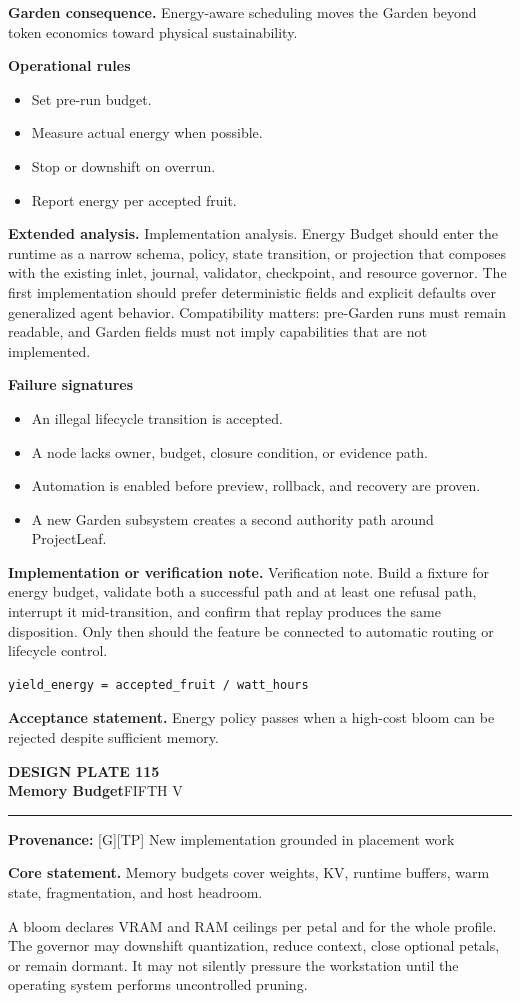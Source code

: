 \documentclass[10pt,letterpaper,oneside]{article}
\newcommand{\prov}[1]{\textcolor{gardenBlue}{\sffamily\footnotesize\textbf{Provenance:} #1}}
\newcommand{\platetitle}[3]{%
  \begin{minipage}[t][0.54in][t]{\textwidth}
  {\sffamily\bfseries\color{gardenDeep}\fontsize{9}{10}\selectfont DESIGN PLATE #1}\\[-1pt]
  {\sffamily\bfseries\color{gardenInk}\fontsize{16.5}{18}\selectfont #2}\hfill{\sffamily\color{gardenGreen}\large #3}
  \end{minipage}\vspace{-2pt}\hrule\vspace{5pt}}
\begin{document}
\textbf{Garden consequence.} Energy-aware scheduling moves the Garden beyond token economics toward physical sustainability.

\textbf{Operational rules}
\begin{itemize}
\item Set pre-run budget.
\item Measure actual energy when possible.
\item Stop or downshift on overrun.
\item Report energy per accepted fruit.
\end{itemize}
\textbf{Extended analysis.} Implementation analysis. Energy Budget should enter the runtime as a narrow schema, policy, state transition, or projection that composes with the existing inlet, journal, validator, checkpoint, and resource governor. The first implementation should prefer deterministic fields and explicit defaults over generalized agent behavior. Compatibility matters: pre-Garden runs must remain readable, and Garden fields must not imply capabilities that are not implemented.

\textbf{Failure signatures}
\begin{itemize}
\item An illegal lifecycle transition is accepted.
\item A node lacks owner, budget, closure condition, or evidence path.
\item Automation is enabled before preview, rollback, and recovery are proven.
\item A new Garden subsystem creates a second authority path around ProjectLeaf.
\end{itemize}
\textbf{Implementation or verification note.} Verification note. Build a fixture for energy budget, validate both a successful path and at least one refusal path, interrupt it mid-transition, and confirm that replay produces the same disposition. Only then should the feature be connected to automatic routing or lifecycle control.

\begin{lstlisting}
yield_energy = accepted_fruit / watt_hours
\end{lstlisting}
\begin{acceptbox}
\textbf{Acceptance statement.} Energy policy passes when a high-cost bloom can be rejected despite sufficient memory.
\end{acceptbox}
\newpage
\platetitle{115}{Memory Budget}{FIFTH V}
\prov{[G][TP] New implementation grounded in placement work}
\fontsize{8.85}{10.45}\selectfont
\begin{corebox}
\textbf{Core statement.} Memory budgets cover weights, KV, runtime buffers, warm state, fragmentation, and host headroom.
\end{corebox}
A bloom declares VRAM and RAM ceilings per petal and for the whole profile. The governor may downshift quantization, reduce context, close optional petals, or remain dormant. It may not silently pressure the workstation until the operating system performs uncontrolled pruning.
\end{document}
